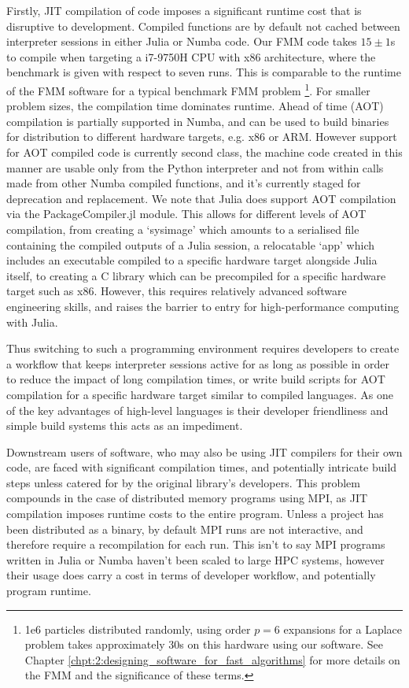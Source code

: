 Firstly, JIT compilation of code imposes a significant runtime cost that is disruptive to development. Compiled functions are by default not cached between interpreter sessions in either Julia or Numba code. Our FMM code takes $15 \pm 1$s to compile when targeting a i7-9750H CPU with x86 architecture, where the benchmark is given with respect to seven runs. This is comparable to the runtime of the FMM software for a typical benchmark FMM problem \footnote{1e6 particles distributed randomly, using order $p=6$ expansions for a Laplace problem takes approximately 30s on this hardware using our software. See Chapter \ref{chpt:2:designing_software_for_fast_algorithms} for more details on the FMM and the significance of these terms.}. For smaller problem sizes, the compilation time dominates runtime. Ahead of time (AOT) compilation is partially supported in Numba, and can be used to build binaries for distribution to different hardware targets, e.g. x86 or ARM. However support for AOT compiled code is currently second class, the machine code created in this manner are usable only from the Python interpreter and not from within calls made from other Numba compiled functions, and it's currently staged for deprecation and replacement. We note that Julia does support AOT compilation via the PackageCompiler.jl module. This allows for different levels of AOT compilation, from creating a `sysimage' which amounts to a serialised file containing the compiled outputs of a Julia session, a relocatable `app' which includes an executable compiled to a specific hardware target alongside Julia itself, to creating a C library which can be precompiled for a specific hardware target such as x86. However, this requires relatively advanced software engineering skills, and raises the barrier to entry for high-performance computing with Julia.

Thus switching to such a programming environment requires developers to create a workflow that keeps interpreter sessions active for as long as possible in order to reduce the impact of long compilation times, or write build scripts for AOT compilation for a specific hardware target similar to compiled languages. As one of the key advantages of high-level languages is their developer friendliness and simple build systems this acts as an impediment.

Downstream users of software, who may also be using JIT compilers for their own code, are faced with significant compilation times, and potentially intricate build steps unless catered for by the original library's developers. This problem compounds in the case of distributed memory programs using MPI, as JIT compilation imposes runtime costs to the entire program. Unless a project has been distributed as a binary, by default MPI runs are not interactive, and therefore require a recompilation for each run. This isn't to say MPI programs written in Julia or Numba haven't been scaled to large HPC systems, however their usage does carry a cost in terms of developer workflow, and potentially program runtime.


